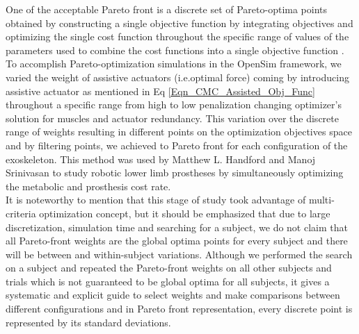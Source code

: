 \documentclass[10pt,letterpaper]{article}
\begin{document}
One of the acceptable Pareto front is a discrete set of Pareto-optima points obtained by constructing a single objective function by integrating objectives and optimizing the single cost function throughout the specific range of values of the parameters used to combine the cost functions into a single objective function \cite{108}. To accomplish Pareto-optimization simulations in the OpenSim framework, we varied the weight of assistive actuators (i.e.optimal force) coming by introducing assistive actuator as mentioned in Eq \ref{Eqn_CMC_Assisted_Obj_Func} throughout a specific range from high to low penalization changing optimizer's solution for muscles and actuator redundancy. This variation over the discrete range of weights resulting in different points on the optimization objectives space and by filtering points, we achieved to Pareto front for each configuration of the exoskeleton. This method was used by Matthew L. Handford and Manoj Srinivasan\cite{111,127} to study robotic lower limb prostheses by simultaneously optimizing the metabolic and prosthesis cost rate. \\
It is noteworthy to mention that this stage of study took advantage of multi-criteria optimization concept, but it should be emphasized that due to large discretization, simulation time and searching for a subject, we do not claim that all Pareto-front weights are the global optima points for every subject and there will be between and within-subject variations. Although we performed the search on a subject and repeated the Pareto-front weights on all other subjects and trials which is not guaranteed to be global optima for all subjects, it gives a systematic and explicit guide to select weights and make comparisons between different configurations and in Pareto front representation, every discrete point is represented by its standard deviations.\\
\end{document}
